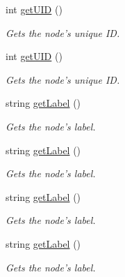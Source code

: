 \begin{DoxyCompactItemize}
int \hyperlink{classAST_ab7a5b1d9f1c2de0d98deb356f724a42c}{get\-U\-I\-D} ()
\begin{DoxyCompactList}\small\item\em Gets the node's unique I\-D. \end{DoxyCompactList}\item 
int \hyperlink{classAST_ab7a5b1d9f1c2de0d98deb356f724a42c}{get\-U\-I\-D} ()
\begin{DoxyCompactList}\small\item\em Gets the node's unique I\-D. \end{DoxyCompactList}\item 
string \hyperlink{classAST_aee029be902fffc927d16ccb03eb922ad}{get\-Label} ()
\begin{DoxyCompactList}\small\item\em Gets the node's label. \end{DoxyCompactList}\item 
string \hyperlink{classAST_aee029be902fffc927d16ccb03eb922ad}{get\-Label} ()
\begin{DoxyCompactList}\small\item\em Gets the node's label. \end{DoxyCompactList}\item 
string \hyperlink{classAST_aee029be902fffc927d16ccb03eb922ad}{get\-Label} ()
\begin{DoxyCompactList}\small\item\em Gets the node's label. \end{DoxyCompactList}\item 
string \hyperlink{classAST_aee029be902fffc927d16ccb03eb922ad}{get\-Label} ()
\begin{DoxyCompactList}\small\item\em Gets the node's label. \end{DoxyCompactList}\end{DoxyCompactItemize}
